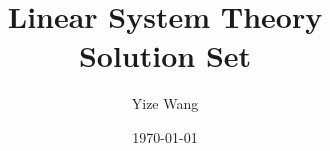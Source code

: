 \documentclass[a4paper,12pt]{book}
\begin{document}
\author{Yize Wang}
\title{Linear System Theory\\Solution Set}
\date{\today}

\frontmatter
\maketitle
\tableofcontents

\mainmatter





\backmatter
\end{document}
